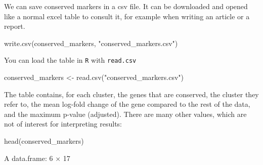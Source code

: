 \documentclass[
  letterpaper,
  DIV=11,
  numbers=noendperiod]{scrartcl}
\newenvironment{Shaded}{\begin{snugshade}}{\end{snugshade}}
\newcommand{\FunctionTok}[1]{\textcolor[rgb]{0.02,0.16,0.49}{#1}}
\newcommand{\NormalTok}[1]{\textcolor[rgb]{0.00,0.44,0.13}{#1}}
\newcommand{\OtherTok}[1]{\textcolor[rgb]{0.00,0.44,0.13}{#1}}
\newcommand{\StringTok}[1]{\textcolor[rgb]{0.25,0.44,0.63}{#1}}
\begin{document}
We can save conserved markers in a csv file. It can be downloaded and
opened like a normal excel table to consult it, for example when writing
an article or a report.

\begin{Shaded}
\begin{Highlighting}[]
\FunctionTok{write.csv}\NormalTok{(conserved\_markers, }\StringTok{"conserved\_markers.csv"}\NormalTok{)}
\end{Highlighting}
\end{Shaded}

You can load the table in \texttt{R} with \texttt{read.csv}

\begin{Shaded}
\begin{Highlighting}[]
\NormalTok{conserved\_markers }\OtherTok{\textless{}{-}} \FunctionTok{read.csv}\NormalTok{(}\StringTok{"conserved\_markers.csv"}\NormalTok{)}
\end{Highlighting}
\end{Shaded}

The table contains, for each cluster, the genes that are conserved, the
cluster they refer to, the mean log-fold change of the gene compared to
the rest of the data, and the maximum p-value (adjusted). There are many
other values, which are not of interest for interpreting results:

\begin{Shaded}
\begin{Highlighting}[]
\FunctionTok{head}\NormalTok{(conserved\_markers)}
\end{Highlighting}
\end{Shaded}

A data.frame: 6 × 17
\end{document}
